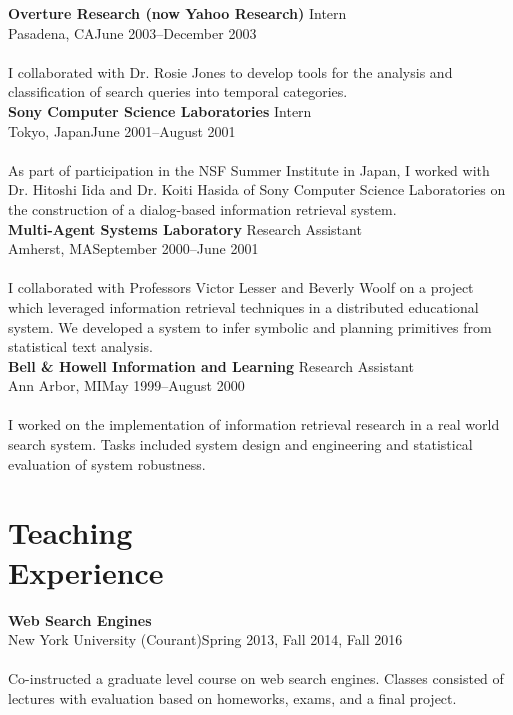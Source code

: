 \documentclass{article}
\begin{document}
\noindent\textbf{Overture Research (now Yahoo Research) }\hfill Intern\\
Pasadena, CA\hfill  June 2003–December 2003\\\\
I collaborated with Dr. Rosie Jones to develop tools for the analysis and classification of search queries into temporal categories. \\%

\noindent\textbf{Sony Computer Science Laboratories }\hfill Intern\\
Tokyo, Japan\hfill  June 2001–August 2001\\\\
As part of participation in the NSF Summer Institute in Japan, I worked with Dr. Hitoshi Iida and Dr. Koiti Hasida of Sony Computer Science Laboratories on the construction of a dialog-based information retrieval system.\\

\noindent\textbf{Multi-Agent Systems Laboratory }\hfill Research Assistant\\
Amherst, MA\hfill  September 2000–June 2001\\\\
I collaborated with Professors Victor Lesser and Beverly Woolf on a project which leveraged information retrieval techniques in a distributed educational system. We developed a system to infer symbolic and planning primitives from statistical text analysis.\\

\noindent\textbf{Bell \& Howell Information and Learning }\hfill Research Assistant\\
Ann Arbor, MI\hfill  May 1999–August 2000\\\\
I worked on the implementation of information retrieval research in a real world search system. Tasks included system design and engineering and statistical evaluation of system robustness.\\


\section{Teaching \\Experience}\noindent\textbf{Web Search Engines} \\
New York University (Courant)\hfill Spring 2013, Fall 2014, Fall 2016\\\\
Co-instructed a graduate level course on web search engines.  Classes consisted of lectures with evaluation based on homeworks, exams, and a final project. \\
\end{document}
